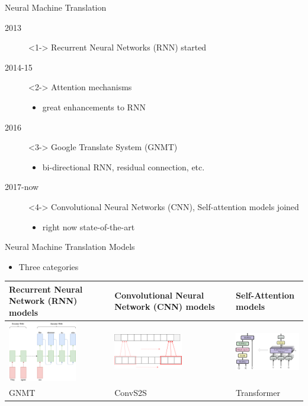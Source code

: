\documentclass[11pt]{beamer}
\begin{document}
\begin{frame}{Neural Machine Translation}
    \begin{description}
        \item[2013]<1-> Recurrent Neural Networks (RNN) started
        \item[2014-15]<2-> Attention mechanisms
        \begin{itemize}
            \item great enhancements to RNN 
        \end{itemize} 
        \item[2016]<3-> Google Translate System (GNMT)
        \begin{itemize}
            \item bi-directional RNN, residual connection, etc.
        \end{itemize} 
        \item[2017-now]<4-> Convolutional Neural Networks (CNN), Self-attention models joined
        \begin{itemize}
            \item right now state-of-the-art
        \end{itemize} 
    \end{description}
\end{frame}

\begin{frame}{Neural Machine Translation Models}
    \begin{itemize}
        \item Three categories
    \end{itemize}
    \begin{table}
        \begin{tabular}{p{3cm}|p{3cm}|p{3cm}}
            Recurrent Neural Network (RNN) models &  Convolutional Neural Network (CNN) models & Self-Attention models \\
            \hline
            \includegraphics[width=3cm]{rnn-encoder-decoder} & \includegraphics[width=3cm]{convolutions} & \includegraphics[width=3cm]{multi-attention}\\
            \hline
            GNMT & ConvS2S & Transformer
        \end{tabular}
    \end{table}
\end{frame}
\end{document}
